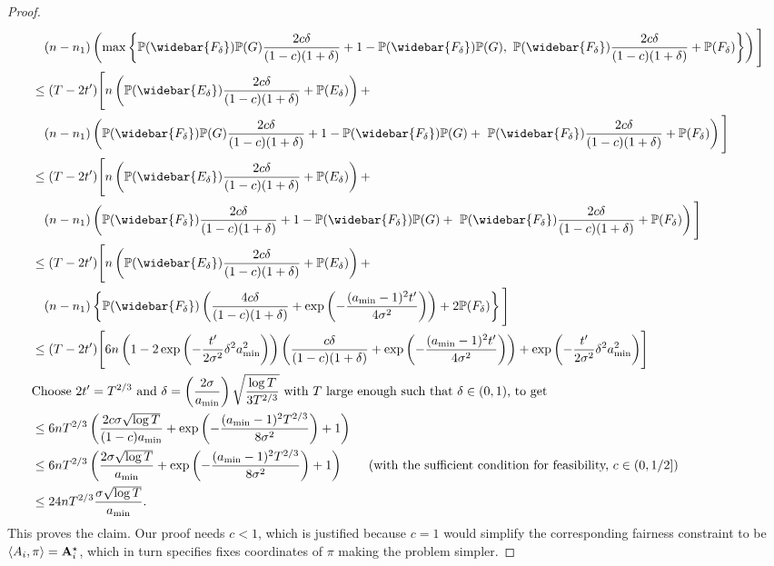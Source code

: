 \begin{proof}
\begin{align*}
    &\quad (n-n_1) \left(\max\left\{ \mathbb{P}(\widebar{F_\delta})\mathbb{P}(G)\frac{2c\delta}{(1-c)(1+\delta)} + 1-\mathbb{P}(\widebar{F_\delta})\mathbb{P}(G),\   
    \mathbb{P}(\widebar{F_\delta})\frac{2c\delta}{(1-c)(1+\delta)} + \mathbb{P}(F_\delta)
    \right\} \right)\Bigg]\\
    &\leq (T-2t')\Bigg[n\left( \mathbb{P}(\widebar{E_\delta})\frac{2c\delta}{(1-c)(1+\delta)} + \mathbb{P}(E_\delta) \right) + \\
    &\quad (n-n_1)\left( \mathbb{P}(\widebar{F_\delta})\mathbb{P}(G)\frac{2c\delta}{(1-c)(1+\delta)} + 1-\mathbb{P}(\widebar{F_\delta})\mathbb{P}(G)+\   
    \mathbb{P}(\widebar{F_\delta})\frac{2c\delta}{(1-c)(1+\delta)} + \mathbb{P}(F_\delta)
     \right)\Bigg]\\
    &\leq (T-2t')\Bigg[n\left( \mathbb{P}(\widebar{E_\delta})\frac{2c\delta}{(1-c)(1+\delta)} + \mathbb{P}(E_\delta) \right) + \\
    &\quad (n-n_1)\left( \mathbb{P}(\widebar{F_\delta})\frac{2c\delta}{(1-c)(1+\delta)} + 1-\mathbb{P}(\widebar{F_\delta})\mathbb{P}(G)+\   
    \mathbb{P}(\widebar{F_\delta})\frac{2c\delta}{(1-c)(1+\delta)} + \mathbb{P}(F_\delta)
     \right)\Bigg]\\
     &\leq (T-2t')\Bigg[n\left( \mathbb{P}(\widebar{E_\delta})\frac{2c\delta}{(1-c)(1+\delta)} + \mathbb{P}(E_\delta) \right)+\\&\quad (n-n_1)\left\{\mathbb{P}(\widebar{F_\delta})\left(\frac{4c\delta}{(1-c)(1+\delta)}+\exp{\left(-\frac{(a_{\min}-1)^2t'}{4\sigma^2}\right)}\right) + 2\mathbb{P}(F_\delta)\right\}\Bigg]\\
     &\leq (T-2t')\Bigg[6n\left( 1-2\exp{\left(-\frac{t'}{2\sigma^2}\delta^2a^2_{\min}\right)}\right)\left(\frac{c\delta }{(1-c)(1+\delta)}+\exp{\left(-\frac{(a_{\min}-1)^2t'}{4\sigma^2}\right)}\right)+ \exp{\left(-\frac{t'}{2\sigma^2}\delta^2a^2_{\min}\right)} \Bigg]\\
     &\textup{Choose }2t'=T^{2/3} \textup{ and }\delta = \left(\frac{2\sigma}{ a_{\min}}\right)\sqrt{\frac{\log{T}}{3T^{2/3}}} \textup{ with }T \textup{ large enough such that }\delta\in(0, 1) \textup{, to get}\\
     & \leq 6nT^{2/3}\left( \frac{2c\sigma \sqrt{\log{T}}}{(1-c)a_{\min}} +\exp\left(-\frac{(a_{\min}-1)^2T^{2/3}}{8\sigma^2}\right)+1\right)\\
     & \leq 6nT^{2/3}\left( \frac{2\sigma \sqrt{\log{T}}}{a_{\min}} +\exp\left(-\frac{(a_{\min}-1)^2T^{2/3}}{8\sigma^2}\right)+1\right) \tag{with the sufficient condition for feasibility, $c\in (0, 1/2]$}\\
     &\leq 24nT^{2/3}\frac{\sigma \sqrt{\log{T}}}{a_{\min}}.
\end{align*}
This proves the claim. Our proof needs $c<1$, which is justified because $c=1$ would simplify the corresponding fairness constraint to be $ \langle A_i,\pi\rangle = \mathbf{A}^{\star}_i$, which in turn specifies fixes coordinates of $\pi$ making the problem simpler.
\end{proof}